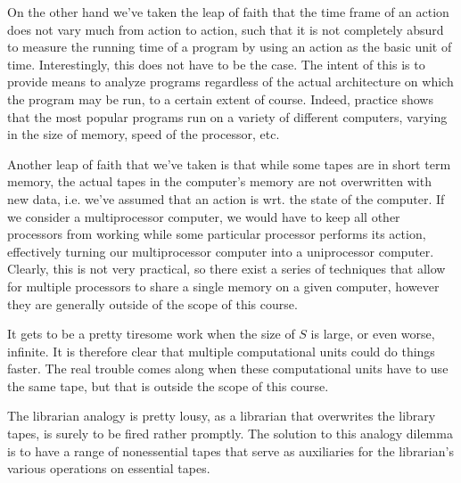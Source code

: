 On the other hand we've taken the leap of faith that the time frame of an
action does not vary much from action to action, such that it is not completely
absurd to measure the running time of a program by using an action as the basic
unit of time. Interestingly, this does not have to be the case. The intent of
this is to provide means to analyze programs regardless of the actual
architecture on which the program may be run, to a certain extent of course.
Indeed, practice shows that the most popular programs run on a variety of
different computers, varying in the size of memory, speed of the processor,
etc.

Another leap of faith that we've taken is that while some tapes are in short
term memory, the actual tapes in the computer's memory are not overwritten with
new data, i.e. we've assumed that an action is  wrt. the state of
the computer. If we consider a multiprocessor computer, we would have to keep
all other processors from working while some particular processor performs its
action, effectively turning our multiprocessor computer into a uniprocessor
computer. Clearly, this is not very practical, so there exist a series of
techniques that allow for multiple processors to share a single memory on a
given computer, however they are generally outside of the scope of this course.


It gets to be a pretty tiresome work when the size of $S$ is large, or even
worse, infinite. It is therefore clear that multiple computational units could
do things faster. The real trouble comes along when these computational units
have to use the same tape, but that is outside the scope of this course.

The librarian analogy is pretty lousy, as a librarian that overwrites the
library tapes, is surely to be fired rather promptly. The solution to this
analogy dilemma is to have a range of nonessential tapes that serve as
auxiliaries for the librarian's various operations on essential tapes.


